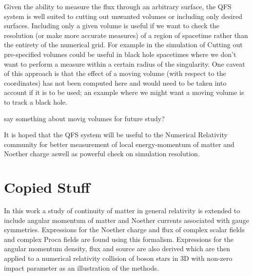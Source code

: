 Given the ability to measure the flux through an arbitrary surface, the QFS system is
well suited to cutting out unwanted volumes or including only desired surfaces. Including
only a given volume is useful if we want to check the resolution (or make more
accurate measures) of a region of spacetime rather than the entirety of the numerical grid. For example
in the simulation of
Cutting out pre-specified volumes could be useful in black hole spacetimes where we
don't want to perform a measure within a certain radius of the singularity. One caveat of
this approach is that the effect of a moving volume (with respect to the coordinates)
has not been computed here and would need to be taken into account if it is to be used;
an example where we might want a moving volume is to track a black hole.

say something about movig volumes for future study?



It is hoped that the QFS system will be useful to the Numerical Relativity community
for better measurement of local energy-momentum of matter and Noether charge aswell
as powerful check on simulation resolution.





\section{Copied Stuff}



In this work a study of continuity of matter in general relativity is extended to
include angular momentum of matter and Noether currents associated with gauge
symmetries. Expressions for the Noether charge and flux of complex scalar fields
and complex Proca fields are found using this formalism. Expressions for the
angular momentum density, flux and source are also derived which are then applied
to a numerical relativity collision of boson stars in 3D with non-zero impact
parameter as an illustration of the methods.

